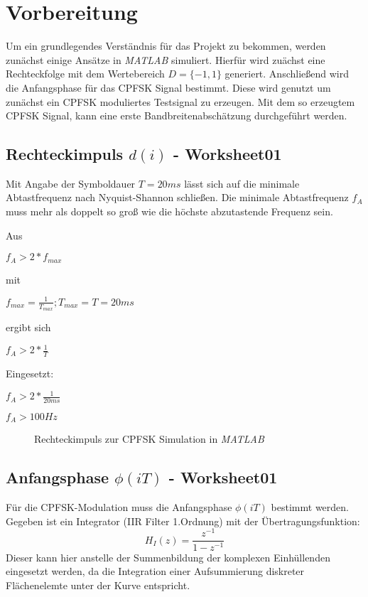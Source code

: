 \documentclass{article}
\begin{document}
\section{Vorbereitung}
Um ein grundlegendes Verständnis für das Projekt zu bekommen, werden zunächst einige Ansätze in \textit{MATLAB} simuliert.
Hierfür wird zuächst eine Rechteckfolge mit dem Wertebereich $D = \{-1,1\}$ generiert. Anschließend wird die Anfangsphase für das CPFSK Signal bestimmt. Diese wird genutzt um zunächst ein 
\ac{CPFSK} moduliertes Testsignal zu erzeugen. Mit dem so erzeugtem CPFSK Signal, kann eine erste Bandbreitenabschätzung durchgeführt werden.


\subsection{Rechteckimpuls $d(i)$ - Worksheet01}\label{sec:rechteck}
Mit Angabe der Symboldauer $T = 20ms$ lässt sich auf die minimale Abtastfrequenz nach Nyquist-Shannon schließen.
Die minimale Abtastfrequenz $f_A$ muss mehr als doppelt so groß wie die höchste abzutastende Frequenz sein.

Aus
\begin{center}
 $
f_A > 2*f_{max}
$
\end{center}

mit 
\begin{center} $f_{max} = \frac{1}{T_{max}} ; T_{max} = T = 20ms$  \end{center}

ergibt sich

\begin{center}
$
f_A > 2*\frac{1}{T}
$
\end{center}

Eingesetzt:
\begin{center}
$f_A > 2*\frac{1}{20ms}$
\end{center}
\begin{center}
$f_A > 100Hz$   
\end{center}
\begin{figure}[!h]
    \centering
    \def\svgscale{0.3}
    \def\svgwidth{\columnwidth}
    \caption{Rechteckimpuls zur \ac{CPFSK} Simulation in \textit{MATLAB}}
\end{figure}

\subsection{Anfangsphase $\phi(iT)$ - Worksheet01}
Für die \ac{CPFSK}-Modulation muss die Anfangsphase $\phi(iT)$ bestimmt werden.
Gegeben ist ein Integrator (IIR Filter 1.Ordnung) mit der Übertragungsfunktion:
$$
H_I(z)=\frac{z^{-1}}{1-z^{-1}}
$$
Dieser kann hier anstelle der Summenbildung der komplexen Einhüllenden eingesetzt werden, 
da die Integration einer Aufsummierung diskreter Flächenelemte unter der Kurve entspricht.
\end{document}
